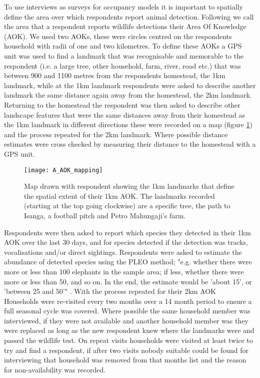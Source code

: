 To use interviews as surveys for occupancy models it is important to spatially define the area over which respondents report animal detection. Following \cite{Zeller2011} we call the area that a respondent reports wildlife detections their Area Of Knowledge (AOK). We used two AOKs, these were circles centred on the respondents household with radii of one and two kilometres. To define these AOKs a GPS unit was used to find a landmark that was recognisable and memorable to the respondent (i.e. a large tree, other household, farm, river, road etc.) that was between 900 and 1100 metres from the respondents homestead, the 1km landmark, while at the 1km landmark respondents were asked to describe another landmark the same distance again away from the homestead, the 2km landmark. Returning to the homestead the respondent was then asked to describe other landscape features that were the same distances away from their homestead as the 1km landmark in different directions these were recorded on a map (figure \ref{fig:AOK_map}) and the process repeated for the 2km landmark. Where possible distance estimates were cross checked by measuring their distance to the homestead with a GPS unit.\\

\begin{figure}[htb]
\centering
\texttt{[image: A\_AOK\_mapping]}
\caption{Map drawn with respondent showing the 1km landmarks that define the spatial extent of their 1km AOK. The landmarks recorded (starting at the top going clockwise) are a specific tree, the path to Isanga, a football pitch and Petro Mahungaji's farm.}
\label{fig:AOK_map}
\end{figure}

Respondents were then asked to report which species they detected in their 1km AOK over the last 30 days, and for species detected if the detection was tracks, vocalisations and/or direct sightings. Respondents were asked to estimate the abundance of detected species using the PLEO method; "e.g. whether there were more or less than 100 elephants in the sample area; if less, whether there were more or less than 50, and so on. In the end, the estimate would be 'about 15', or 'between 25 and 50'" \cite{VanderHoeven2004}. With the process repeated for their 2km AOK\\

Households were re-visited every two months over a 14 month period to ensure a full seasonal cycle was covered. Where possible the same household member was interviewed, if they were not available and another household member was they were replaced as long as the new respondent knew where the landmarks were and passed the wildlife test. On repeat visits households were visited at least twice to try and find a respondent, if after two visits nobody suitable could be found for interviewing that household was removed from that months list and the reason for non-availability was recorded.\\

